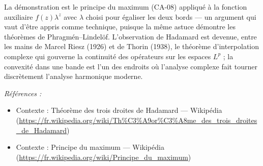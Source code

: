 \documentclass[11pt]{article}
\newenvironment{refs}{\par\small\noindent\emph{Références :}\begin{itemize}\setlength\itemsep{0pt}}{\end{itemize}\normalsize}
\begin{document}
\noindent La démonstration est le principe du maximum (CA-08) appliqué à la fonction
auxiliaire $ f(z) \lambda^{z} $ avec $ \lambda $ choisi pour égaliser les deux bords --- un
argument qui vaut d'être appris comme technique, puisque la même astuce démontre les théorèmes de
Phragmén--Lindelöf. L'observation de Hadamard est devenue, entre les mains de Marcel Riesz (1926) et
de Thorin (1938), le théorème d'interpolation complexe qui gouverne la continuité des opérateurs sur
les espaces $ L^p $ ; la convexité dans une bande est l'un des endroits où l'analyse complexe fait
tourner discrètement l'analyse harmonique moderne.

\begin{refs}
\item Contexte : Théorème des trois droites de Hadamard --- Wikipédia (\url{https://fr.wikipedia.org/wiki/Th%C3%A9or%C3%A8me_des_trois_droites_de_Hadamard})
\item Contexte : Principe du maximum --- Wikipédia (\url{https://fr.wikipedia.org/wiki/Principe_du_maximum})
\end{refs}

\bigskip
\end{document}
